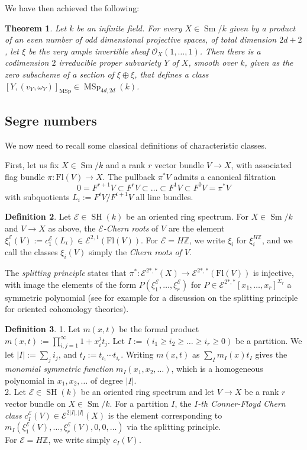 \documentclass[10pt]{amsart}
\theoremstyle{definition}
\newtheorem{defn}{Definition}[section]
\theoremstyle{plain}
\newtheorem{thm}[defn]{Theorem}
\numberwithin{equation}{section}
\newcommand{\0}{\emptyset}
\newcommand{\sE}{{\mathcal E}}
\newcommand{\sO}{{\mathcal O}}
\newcommand{\Z}{{\mathbb Z}}
\newcommand{\MSp}{{\operatorname{MSp}}}
\newcommand{\SH}{{\operatorname{SH}}}
\newcommand{\Sm}{{\operatorname{Sm}}}
\begin{document}
 We have then achieved the following:

 \begin{thm}
 \label{thm:symplecticclasses}
    Let $k$ be an infinite field. For every $X \in \Sm/k$ given by a product of an even number of odd dimensional projective spaces, of total dimension $2d+2$, let $\xi$ be the very ample invertible sheaf $\sO_X(1,\ldots, 1)$. Then there is a codimension $2$ irreducible proper subvariety $Y$ of $X$, smooth over $k$, given as the zero subscheme of a section of $\xi\oplus \xi$, that defines a class $[Y, (v_Y,\omega_Y)]_\MSp \in \MSp_{4d,2d}(k)$.
 \end{thm}

 \subsection{Segre numbers}

We now need to recall some classical definitions of characteristic classes.

First, let us fix $X\in \Sm/k$ and a rank $r$ vector bundle $V\to X$, with associated flag bundle $\pi:\text{Fl}(V)\to X$. The pullback $\pi^*V$ admits a canonical filtration
\[
0=F^{r+1}V\subset F^rV\subset\ldots\subset F^1V\subset F^0V=\pi^*V
\]
with subquotients $L_i:=F^iV/F^{i+1}V$ all line bundles.

\begin{defn}
    Let $\sE\in \SH(k)$ be an oriented ring spectrum. For $X \in \Sm/k$ and $V \to X$ as above, the {\em $\sE$-Chern roots} of $V$ are the element $\xi_i^\sE(V):=c_1^\sE(L_i)\in \sE^{2,1}(\text{Fl}(V))$. For $\sE=H\Z$, we write $\xi_i$ for $\xi_i^{H\Z}$, and we call the classes $\xi_i(V)$ simply the \emph{Chern roots of $V$}.
\end{defn}

The {\em splitting principle} states that $\pi^*:\sE^{2*,*}(X)\to \sE^{2*,*}(\text{Fl}(V))$ is injective, with image the elements of the form $P(\xi^\sE_1,\ldots, \xi^\sE_r)$ for $P\in \sE^{2*,*}[x_1,\ldots, x_r]^{\Sigma_r}$ a symmetric polynomial (see for example \cite[\S 3.5]{Pan:oriented} for a discussion on the splitting principle for oriented cohomology theories).

\begin{defn} 1. Let $m(x,t)$ be the formal product $m(x,t):=\prod_{i,j=1}^\infty 1+x_i^jt_j$. Let $I:=(i_1\ge i_2\ge\ldots \ge i_r\ge 0)$ be a partition. We let $|I|:=\sum_j i_j$, and $t_I:=t_{i_1}\cdots t_{i_r}$. Writing $m(x,t)$ as $\sum_I m_I(x)t_I$ gives the {\em monomial symmetric function} $m_I(x_1, x_2,\ldots)$, which is a homogeneous polynomial in $x_1, x_2,\ldots$ of degree $|I|$. \\[2pt]
2. Let $\sE\in \SH(k)$ be an oriented ring spectrum and let $V\to X$ be a rank $r$ vector bundle on $X\in \Sm/k$. For a partition $I$, the {\em $I$-th Conner-Floyd Chern class} $c_I^\sE(V)\in \sE^{2|I|,|I|}(X)$ is the element corresponding to $m_I(\xi_1^\sE(V),\ldots, \xi_r^\sE(V), 0,0,\ldots)$ via the splitting principle. \\[5pt]
For $\sE=H\Z$, we write simply  $c_I(V)$. 
\end{defn}
\end{document}
